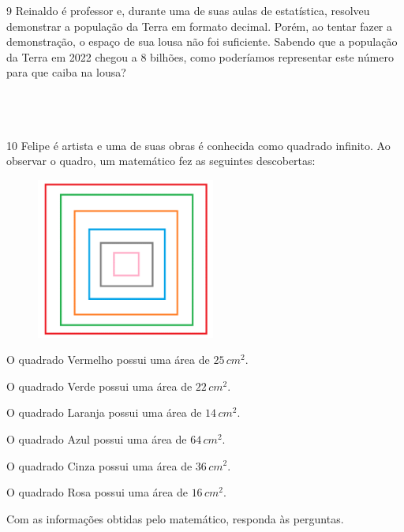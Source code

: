 \num{9} Reinaldo é professor e, durante uma de suas aulas de estatística,
resolveu demonstrar a população da Terra em formato decimal. Porém, ao
tentar fazer a demonstração, o espaço de sua lousa não foi suficiente.
Sabendo que a população da Terra em 2022 chegou a 8 bilhões, como
poderíamos representar este número para que caiba na lousa?

\\
\\
\\

\num{10} Felipe é artista e uma de suas obras é conhecida como quadrado
infinito. Ao observar o quadro, um matemático fez as seguintes
descobertas:

\begin{multicols}{2}

\begin{figure}[H]
\centering\includegraphics[width=2.3125in,height=2.07917in]{./imgSAEB_8_MAT/media/image2.png}
\end{figure}

\columnbreak

O quadrado Vermelho possui uma área de $25\,cm^2$.

O quadrado Verde possui uma área de $22\,cm^2$.

O quadrado Laranja possui uma área de $14\,cm^2$.

O quadrado Azul possui uma área de $64\,cm^2$.

O quadrado Cinza possui uma área de $36\,cm^2$.

O quadrado Rosa possui uma área de $16\,cm^2$.
\end{multicols}

Com as informações obtidas pelo matemático, responda às perguntas.

